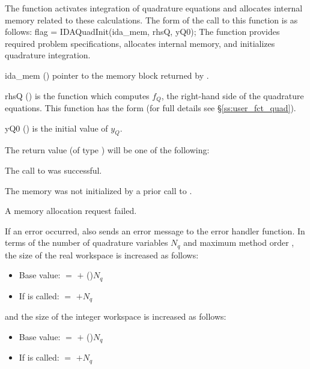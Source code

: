 {The function  activates integration of quadrature equations
and allocates internal memory related to these calculations.
The form of the call to this function is as follows:
{
flag = IDAQuadInit(ida\_mem, rhsQ, yQ0);
}
{
  The function  provides required problem specifications,
  allocates internal memory, and initializes quadrature integration.
}
{
  \begin{args}
  \item[ida\_mem] ()
    pointer to the {\idas} memory block returned by .
  \item[rhsQ] ()
    is the {\CC} function which computes $f_Q$, the right-hand side of the quadrature
    equations. This function has the form
     (for full details see \S\ref{ss:user_fct_quad}).
  \item[yQ0] ()
    is the initial value of $y_Q$.
  \end{args}
}
{
  The return value  (of type ) will be one of the following:
  \begin{args}
  \item[\Id{IDA\_SUCCESS}]
    The call to  was successful.
  \item[\Id{IDA\_MEM\_NULL}]
    The {\idas} memory was not initialized by a prior call to .
  \item[\Id{IDA\_MEM\_FAIL}]
    A memory allocation request failed.
  \end{args}
}
{
  If an error occurred,  also sends an error message to the
  error handler function.
}
In terms of the number of quadrature variables $N_q$ and maximum
method order , the size of the real workspace is increased
as follows:
\begin{itemize}
\item Base value:  $=$  $+$ ()$N_q$
\item If  is called:  $=$  $+ N_q$
\end{itemize}
and the size of the integer workspace is increased as follows:
\begin{itemize}
\item Base value:  $=$  $+$ ()$N_q$
\item If  is called:  $=$  $+ N_q$
\end{itemize}

}
